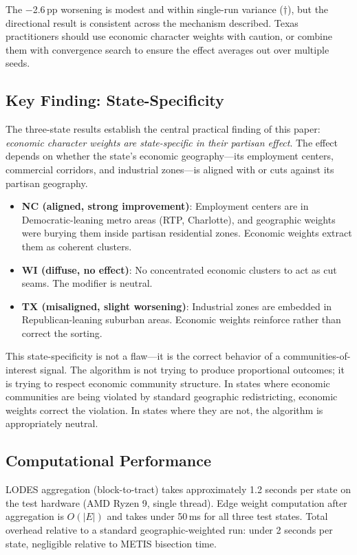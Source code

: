 The $-$2.6\,pp worsening is modest and within single-run variance ($\dagger$),
but the directional result is consistent across the mechanism described.
Texas practitioners should use economic character weights with caution,
or combine them with convergence search to ensure the effect averages out
over multiple seeds.

\subsection{Key Finding: State-Specificity}

The three-state results establish the central practical finding of this paper:
\emph{economic character weights are state-specific in their partisan effect}.
The effect depends on whether the state's economic geography---its employment
centers, commercial corridors, and industrial zones---is aligned with or
cuts against its partisan geography.

\begin{itemize}
  \item \textbf{NC (aligned, strong improvement)}: Employment centers are
    in Democratic-leaning metro areas (RTP, Charlotte), and geographic weights
    were burying them inside partisan residential zones. Economic weights
    extract them as coherent clusters.
  \item \textbf{WI (diffuse, no effect)}: No concentrated economic clusters
    to act as cut seams. The modifier is neutral.
  \item \textbf{TX (misaligned, slight worsening)}: Industrial zones are
    embedded in Republican-leaning suburban areas. Economic weights reinforce
    rather than correct the sorting.
\end{itemize}

This state-specificity is not a flaw---it is the correct behavior of a
communities-of-interest signal.
The algorithm is not trying to produce proportional outcomes; it is trying to
respect economic community structure.
In states where economic communities are being violated by standard
geographic redistricting, economic weights correct the violation.
In states where they are not, the algorithm is appropriately neutral.

\subsection{Computational Performance}

LODES aggregation (block-to-tract) takes approximately 1.2 seconds per state
on the test hardware (AMD Ryzen 9, single thread).
Edge weight computation after aggregation is $O(|E|)$ and takes under 50\,ms
for all three test states.
Total overhead relative to a standard geographic-weighted run: under 2 seconds
per state, negligible relative to METIS bisection time.
